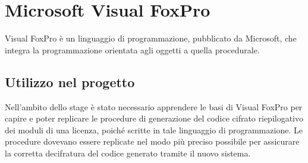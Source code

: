 \section{Microsoft Visual FoxPro}
Visual FoxPro è un linguaggio di programmazione, pubblicato da Microsoft, che integra la programmazione orientata agli oggetti a quella procedurale.

\subsection{Utilizzo nel progetto}
Nell'ambito dello stage è stato necessario apprendere le basi di Visual FoxPro per capire e poter replicare le procedure di generazione del codice cifrato riepilogativo dei moduli di una licenza, poiché scritte in tale linguaggio di programmazione. Le procedure dovevano essere replicate nel modo più preciso possibile per assicurare la corretta decifratura del codice generato tramite il nuovo sistema. 